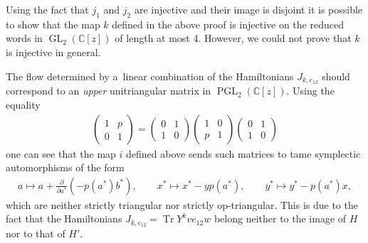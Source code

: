 \documentclass[11pt]{article}
\newcommand{\bb}[1]{\mathbb{#1}}
\DeclareMathOperator{\tr}{Tr}
\DeclareMathOperator{\GL}{GL}
\DeclareMathOperator{\PGL}{PGL}
\begin{document}
\begin{remark}
Using the fact that \(j_{1}\) and \(j_{2}\) are injective and their image is disjoint it is possible to
show that the map \(k\) def\/ined in the above proof is injective on the reduced words in
\(\GL_{2}(\bb{C}[z])\) of length at most 4.
However, we could not prove that \(k\) is injective in general.
\end{remark}
\begin{remark}
\label{rem:ot-h}
The f\/low determined by a~linear combination of the Hamiltonians \(J_{k,e_{12}}\) should correspond to an
\emph{upper} unitriangular matrix in \(\PGL_{2}(\bb{C}[z])\).
Using the equality
\begin{gather*}
\begin{pmatrix}
1&p
\\
0&1
\end{pmatrix}
=
\begin{pmatrix}
0&1
\\
1&0
\end{pmatrix}
\begin{pmatrix}
1&0
\\
p&1
\end{pmatrix}
\begin{pmatrix}
0&1
\\
1&0
\end{pmatrix}
\end{gather*}
one can see that the map \(i\) def\/ined above sends such matrices to tame symplectic automorphisms of the
form
\begin{gather*}
a\mapsto a+\frac{\partial}{\partial a^{*}}(-p(a^{*})b^{*}),
\qquad
x^{*}\mapsto x^{*}-yp(a^{*}),
\qquad
y^{*}\mapsto y^{*}-p(a^{*})x,
\end{gather*}
which are neither strictly triangular nor strictly op-triangular.
This is due to the fact that the Hamiltonians \(J_{k,e_{12}} = \tr Y^{k}ve_{12}w\) belong neither to the
image of \(H\) nor to that of \(H'\).
\end{remark}
\end{document}
